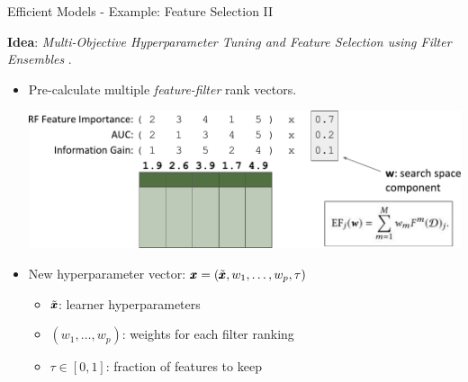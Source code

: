 \documentclass[11pt,compress,t,notes=noshow,xcolor=table]{beamer}
\begin{document}
\begin{vbframe}{Efficient Models - Example: Feature Selection II}

\textbf{Idea}: \emph{Multi-Objective Hyperparameter Tuning and Feature Selection using Filter Ensembles}
.

\begin{itemize}
  \item Pre-calculate multiple \emph{feature-filter} rank vectors.

  \begin{center}
    \includegraphics[width=0.7\linewidth]{slides/11-multicrit/figure_man/mosmafs_presentation_p39.pdf}
  \end{center}

  \item New hyperparameter vector: $\pmb{x} = (\tilde{\pmb{x}}, w_1,\dots,w_p, \tau)$
  \begin{itemize}
    \item $\tilde{\pmb{x}}$: learner hyperparameters
    \item $(w_1,\dots,w_p)$: weights for each filter ranking
    \item $\tau\in [0,1]$: fraction of features to keep
  \end{itemize}
\end{itemize}

\end{vbframe}
\end{document}
